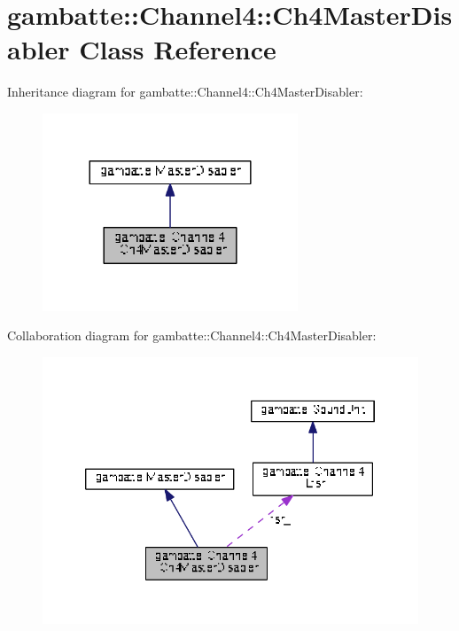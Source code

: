 \hypertarget{classgambatte_1_1Channel4_1_1Ch4MasterDisabler}{}\section{gambatte\+:\+:Channel4\+:\+:Ch4\+Master\+Disabler Class Reference}
\label{classgambatte_1_1Channel4_1_1Ch4MasterDisabler}


Inheritance diagram for gambatte\+:\+:Channel4\+:\+:Ch4\+Master\+Disabler\+:
\nopagebreak
\begin{figure}[H]
\begin{center}
\leavevmode
\includegraphics[width=216pt]{classgambatte_1_1Channel4_1_1Ch4MasterDisabler__inherit__graph}
\end{center}
\end{figure}


Collaboration diagram for gambatte\+:\+:Channel4\+:\+:Ch4\+Master\+Disabler\+:
\nopagebreak
\begin{figure}[H]
\begin{center}
\leavevmode
\includegraphics[width=346pt]{classgambatte_1_1Channel4_1_1Ch4MasterDisabler__coll__graph}
\end{center}
\end{figure}
